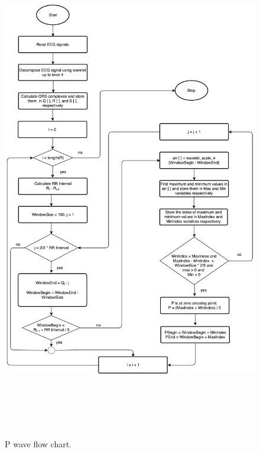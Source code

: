 \begin{figure}[htpb]
	\centering
	\includegraphics[width=25cm,height=22cm,keepaspectratio=true]{images/p_Wave.pdf}
	\caption{
		P wave flow chart.
	}
	\label{fig:p_peaks_flow_chart}
\end{figure}

